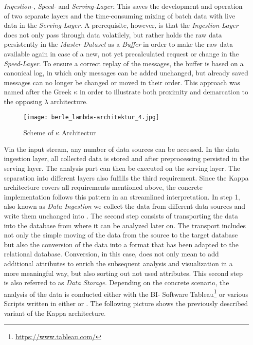 \textit{Ingestion-}, \textit{Speed-} and \textit{Serving-Layer}.
This saves the development and operation of two separate layers and the time-consuming mixing of batch data with live data in the \textit{Serving-Layer}.
A prerequisite, however, is that the \textit{Ingestion-Layer} does not only pass through data volatilely,
but rather holds the raw data persistently in the \textit{Master-Dataset} as a \textit{Buffer} in order to make the raw data available again in case of a new,
not yet precalculated request or change in the \textit{Speed-Layer}.
To ensure a correct replay of the messages, the buffer is based on a canonical log, in which only messages can be added unchanged, but already saved messages can no
longer be changed or moved in their order.
This approach was named after the Greek $\kappa$ in order to illustrate both proximity and demarcation to the opposing $\lambda$ architecture.
\cite{Kappa} \cite{Kappa2}
\begin{figure}[h]
	\centering
	\texttt{[image: berle\_lambda-architektur\_4.jpg]}
	\caption[Scheme of $\kappa$ Architectur]{Scheme of $\kappa$ Architectur\cite{jaxkappa}}
	\label{fig:KappaArchitecture}
\end{figure}
Via the input stream, any number of data sources can be accessed. In the
data ingestion layer, all collected data is stored and after preprocessing persisted in the serving layer.
The analysis part can then be executed on the serving layer.
The separation into different layers also fulfills the third requirement. Since the Kappa architecture covers all requirements mentioned above, the concrete implementation follows this pattern in an streamlined interpretation.
\newline
\newline
In step 1, also known as \textit{Data Ingestion} we collect the data from different data sources and write them unchanged into \gds{}.
The second step consists of transporting the data into the \pg{} database from where it can be analyzed later on.
The transport includes not only the simple moving of the data from the source to the target database but also the conversion of the data
into a format that has been adapted to the relational database.
Conversion, in this case, does not only mean to add additional attributes to enrich the subsequent analysis and visualization in a more meaningful way,
but also sorting out not used attributes. This second step is also referred to as \textit{Data Storage}.
Depending on the concrete scenario, the analysis of the data is conducted either with the BI- Software Tableau\footnote{\url{https://www.tableau.com/}} or various Scripts written in either  or .
\newline
The following picture shows the previously described variant of the Kappa architecture.
